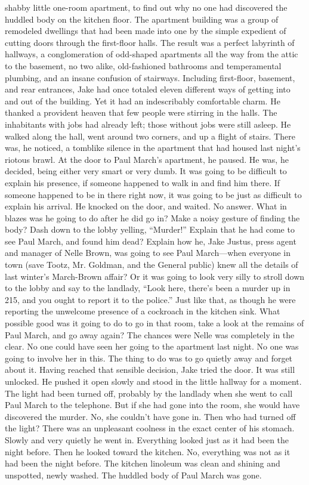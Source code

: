 \documentclass{novel}
\begin{document}
shabby little one-room apartment, to find out why no one had discovered the huddled body on the kitchen floor. The apartment building was a group of remodeled dwellings that had been made into one by the simple expedient of cutting doors through the first-floor halls. The result was a perfect labyrinth of hallways, a conglomeration of odd-shaped apartments all the way from the attic to the basement, no two alike, old-fashioned bathrooms and temperamental plumbing, and an insane confusion of stairways. Including first-floor, basement, and rear entrances, Jake had once totaled eleven different ways of getting into and out of the building. Yet it had an indescribably comfortable charm. He thanked a provident heaven that few people were stirring in the halls. The inhabitants with jobs had already left; those without jobs were still asleep. He walked along the hall, went around two corners, and up a flight of stairs. There was, he noticed, a tomblike silence in the apartment that had housed last night’s riotous brawl. At the door to Paul March’s apartment, he paused. He was, he decided, being either very smart or very dumb. It was going to be difficult to explain his presence, if someone happened to walk in and find him there. If someone happened to be in there right now, it was going to be just as difficult to explain his arrival. He knocked on the door, and waited. No answer. What in blazes was he going to do after he did go in? Make a noisy gesture of finding the body? Dash down to the lobby yelling, “Murder!” Explain that he had come to see Paul March, and found him dead? Explain how he, Jake Justus, press agent and manager of Nelle Brown, was going to see Paul March—when everyone in town (save Tootz, Mr. Goldman, and the General public) knew all the details of last winter’s March-Brown affair? Or it was going to look very silly to stroll down to the lobby and say to the landlady, “Look here, there’s been a murder up in 215, and you ought to report it to the police.” Just like that, as though he were reporting the unwelcome presence of a cockroach in the kitchen sink. What possible good was it going to do to go in that room, take a look at the remains of Paul March, and go away again? The chances were Nelle was completely in the clear. No one could have seen her going to the apartment last night. No one was going to involve her in this. The thing to do was to go quietly away and forget about it. Having reached that sensible decision, Jake tried the door. It was still unlocked. He pushed it open slowly and stood in the little hallway for a moment. The light had been turned off, probably by the landlady when she went to call Paul March to the telephone. But if she had gone into the room, she would have discovered the murder. No, she couldn’t have gone in. Then who had turned off the light? There was an unpleasant coolness in the exact center of his stomach. Slowly and very quietly he went in. Everything looked just as it had been the night before. Then he looked toward the kitchen. No, everything was not as it had been the night before. The kitchen linoleum was clean and shining and unspotted, newly washed. The huddled body of Paul March was gone.
\end{document}
